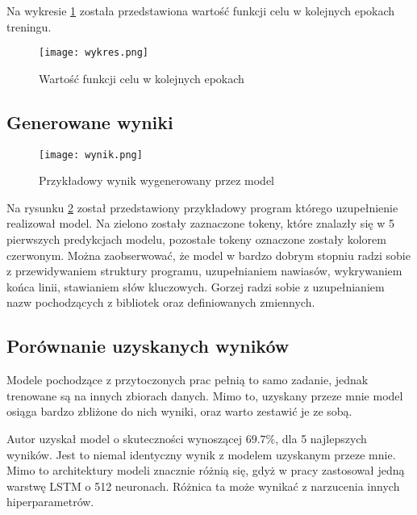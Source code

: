 Na wykresie \ref{wykres} została przedstawiona wartość funkcji celu w kolejnych epokach treningu. 
\begin{figure}[!h]
    \caption{Wartość funkcji celu w kolejnych epokach}

    \label{wykres}
    \centering \texttt{[image: wykres.png]}
\end{figure}

\subsection{Generowane wyniki}
\begin{figure}[!h]
    \caption{Przykładowy wynik wygenerowany przez model}

    \label{fig:wynik}
    \centering \texttt{[image: wynik.png]}
\end{figure}
Na rysunku \ref{fig:wynik} został przedstawiony przykładowy program którego uzupełnienie realizował model. Na zielono zostały zaznaczone tokeny,
które znalazły się w 5 pierwszych predykcjach modelu, pozostałe tokeny oznaczone zostały kolorem czerwonym. Można zaobserwować, że 
model w bardzo dobrym stopniu radzi sobie z przewidywaniem struktury programu, uzupełnianiem nawiasów, wykrywaniem końca linii, stawianiem słów kluczowych. 
Gorzej radzi sobie z uzupełnianiem nazw pochodzących z bibliotek oraz definiowanych zmiennych. 

\subsection{Porównanie uzyskanych wyników}
Modele pochodzące z przytoczonych prac pełnią to samo zadanie, jednak trenowane są na innych zbiorach danych. Mimo to, 
uzyskany przeze mnie model osiąga bardzo zbliżone do nich wyniki, oraz warto zestawić je ze sobą. 

Autor \cite{erik} uzyskał model o skuteczności wynoszącej \begin{math}69.7\%\end{math}, dla 
5 najlepszych wyników. Jest to niemal identyczny wynik z modelem uzyskanym przeze mnie. Mimo to architektury 
modeli znacznie różnią się, gdyż w pracy zastosował jedną warstwę LSTM o 512 neuronach. Różnica ta może wynikać z narzucenia innych 
hiperparametrów. 

